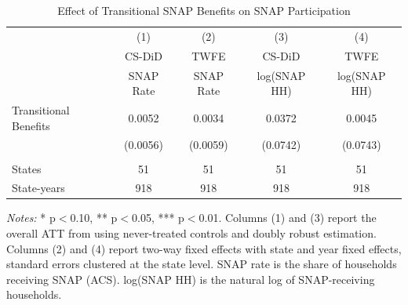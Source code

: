 
\begin{table}[H]
\centering
\caption{Effect of Transitional SNAP Benefits on SNAP Participation}
\label{tab:main}
\begin{threeparttable}
\begin{tabular}{lcccc}
\toprule
 & (1) & (2) & (3) & (4) \\
 & CS-DiD & TWFE & CS-DiD & TWFE \\
 & SNAP Rate & SNAP Rate & log(SNAP HH) & log(SNAP HH) \\
\midrule
Transitional Benefits & 0.0052 & 0.0034 & 0.0372 & 0.0045 \\
 & (0.0056) & (0.0059) & (0.0742) & (0.0743) \\
\\
States & 51 & 51 & 51 & 51 \\
State-years & 918 & 918 & 918 & 918 \\
\bottomrule
\end{tabular}
\begin{tablenotes}[flushleft]
\small
\item \textit{Notes:} * p$<$0.10, ** p$<$0.05, *** p$<$0.01. Columns (1) and (3) report the overall ATT from \citet{callaway2021difference} using never-treated controls and doubly robust estimation. Columns (2) and (4) report two-way fixed effects with state and year fixed effects, standard errors clustered at the state level. SNAP rate is the share of households receiving SNAP (ACS). log(SNAP HH) is the natural log of SNAP-receiving households.
\end{tablenotes}
\end{threeparttable}
\end{table}
